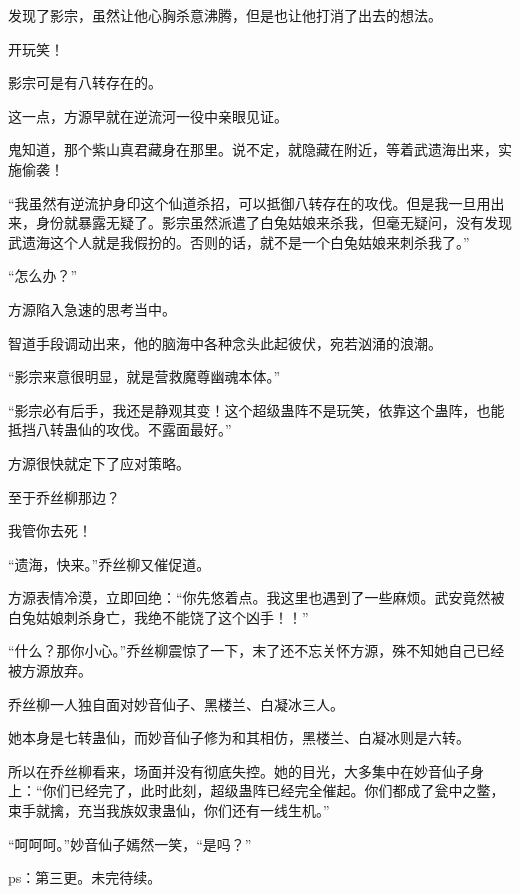 \begin{this_body}
发现了影宗，虽然让他心胸杀意沸腾，但是也让他打消了出去的想法。

开玩笑！

影宗可是有八转存在的。

这一点，方源早就在逆流河一役中亲眼见证。

鬼知道，那个紫山真君藏身在那里。说不定，就隐藏在附近，等着武遗海出来，实施偷袭！

“我虽然有逆流护身印这个仙道杀招，可以抵御八转存在的攻伐。但是我一旦用出来，身份就暴露无疑了。影宗虽然派遣了白兔姑娘来杀我，但毫无疑问，没有发现武遗海这个人就是我假扮的。否则的话，就不是一个白兔姑娘来刺杀我了。”

“怎么办？”

方源陷入急速的思考当中。

智道手段调动出来，他的脑海中各种念头此起彼伏，宛若汹涌的浪潮。

“影宗来意很明显，就是营救魔尊幽魂本体。”

“影宗必有后手，我还是静观其变！这个超级蛊阵不是玩笑，依靠这个蛊阵，也能抵挡八转蛊仙的攻伐。不露面最好。”

方源很快就定下了应对策略。

至于乔丝柳那边？

我管你去死！

“遗海，快来。”乔丝柳又催促道。

方源表情冷漠，立即回绝：“你先悠着点。我这里也遇到了一些麻烦。武安竟然被白兔姑娘刺杀身亡，我绝不能饶了这个凶手！！”

“什么？那你小心。”乔丝柳震惊了一下，末了还不忘关怀方源，殊不知她自己已经被方源放弃。

乔丝柳一人独自面对妙音仙子、黑楼兰、白凝冰三人。

她本身是七转蛊仙，而妙音仙子修为和其相仿，黑楼兰、白凝冰则是六转。

所以在乔丝柳看来，场面并没有彻底失控。她的目光，大多集中在妙音仙子身上：“你们已经完了，此时此刻，超级蛊阵已经完全催起。你们都成了瓮中之鳖，束手就擒，充当我族奴隶蛊仙，你们还有一线生机。”

“呵呵呵。”妙音仙子嫣然一笑，“是吗？”

ps：第三更。未完待续。

\end{this_body}

